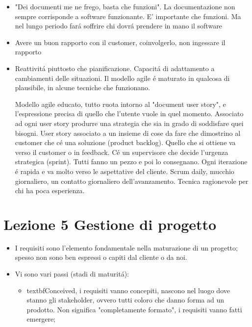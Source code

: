 \documentclass[10pt]{article}
\begin{document}
\begin{itemize}
\begin{itemize}
\begin{itemize}
\begin{itemize}
	\item "Dei documenti me ne frego, basta che funzioni". La documentazione 
	non sempre corrisponde a software funzionante. E' importante che funzioni. 
	Ma nel lungo periodo far\'a soffrire chi dovr\'a prendere in mano il 
	software
	
	\item Avere un buon rapporto con il customer, coinvolgerlo, non ingessare 
	il rapporto
	
	\item Reattivit\'a piuttosto che pianificazione. Capacit\'a di adattamento 
	a cambiamenti delle situazioni.
	Il modello agile \'e maturato in qualcosa di plausibile, in alcune tecniche 
	che funzionano.
	
	
	Modello agile educato, tutto ruota intorno al "document user story", e 
	l'espressione precisa di quello
	che l'utente vuole in quel momento. Associato ad ogni user story produrre 
	una strategia che sia in grado di soddisfare quei bisogni. User story 
	associato a un insieme di cose da fare che dimostrino al customer
	che c\'e una soluzione (product backlog). Quello che si ottiene va verso il 
	customer o in feedback. C\'e un supervisore che decide l'urgenza strategica 
	(sprint). Tutti fanno un pezzo e poi lo consegnano. Ogni iterazione \'e 
	rapida e va molto verso le aspettative del cliente.
	Scrum daily, mucchio giornaliero, un contatto giornaliero dell'avanzamento. 
	Tecnica ragionevole per chi ha poca esperienza.
	\end{itemize}
\end{itemize}	

\end{itemize}
\section{Lezione 5 Gestione di progetto}
\begin{itemize}
	\item I requisiti sono l'elemento fondamentale nella maturazione di un 
	progetto; spesso non sono ben espressi o capiti dal cliente o da noi. 
	
	\item Vi sono vari passi (stadi di maturit\'a):
	\begin{itemize}
		
	\item textbf{Conceived}, i requisiti vanno concepiti, nascono nel luogo 
	dove stanno gli stakeholder, ovvero tutti coloro che danno forma ad un 
	prodotto. Non significa "completamente formato", i requisiti vanno fatti
	emergere;
	

\end{itemize}
\end{itemize}
\end{itemize}
\end{document}
